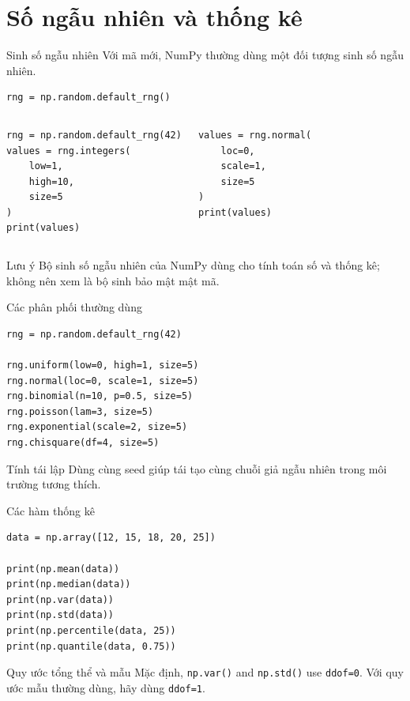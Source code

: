 \documentclass[aspectratio=169,11pt]{beamer}
\begin{document}
\section{Số ngẫu nhiên và thống kê}

\begin{frame}[fragile]{Sinh số ngẫu nhiên}
\small
Với mã mới, NumPy thường dùng một đối tượng sinh số ngẫu nhiên.
\begin{lstlisting}[style=py]
rng = np.random.default_rng()
\end{lstlisting}
\begin{columns}[T]
\begin{lstlisting}[style=py]
rng = np.random.default_rng(42)
values = rng.integers(
    low=1,
    high=10,
    size=5
)
print(values)
\end{lstlisting}
\begin{lstlisting}[style=py]
values = rng.normal(
    loc=0,
    scale=1,
    size=5
)
print(values)
\end{lstlisting}
\end{columns}
\begin{alertblock}{Lưu ý}
Bộ sinh số ngẫu nhiên của NumPy dùng cho tính toán số và thống kê; không nên xem là bộ sinh bảo mật mật mã.
\end{alertblock}
\end{frame}

\begin{frame}[fragile]{Các phân phối thường dùng}
\small
\begin{lstlisting}[style=py]
rng = np.random.default_rng(42)

rng.uniform(low=0, high=1, size=5)
rng.normal(loc=0, scale=1, size=5)
rng.binomial(n=10, p=0.5, size=5)
rng.poisson(lam=3, size=5)
rng.exponential(scale=2, size=5)
rng.chisquare(df=4, size=5)
\end{lstlisting}
\begin{block}{Tính tái lập}
Dùng cùng seed giúp tái tạo cùng chuỗi giả ngẫu nhiên trong môi trường tương thích.
\end{block}
\end{frame}

\begin{frame}[fragile]{Các hàm thống kê}
\small
\begin{lstlisting}[style=py]
data = np.array([12, 15, 18, 20, 25])

print(np.mean(data))
print(np.median(data))
print(np.var(data))
print(np.std(data))
print(np.percentile(data, 25))
print(np.quantile(data, 0.75))
\end{lstlisting}
\begin{block}{Quy ước tổng thể và mẫu}
Mặc định, \texttt{np.var()} and \texttt{np.std()} use \texttt{ddof=0}. Với quy ước mẫu thường dùng, hãy dùng \texttt{ddof=1}.
\end{block}
\end{frame}
\end{document}
